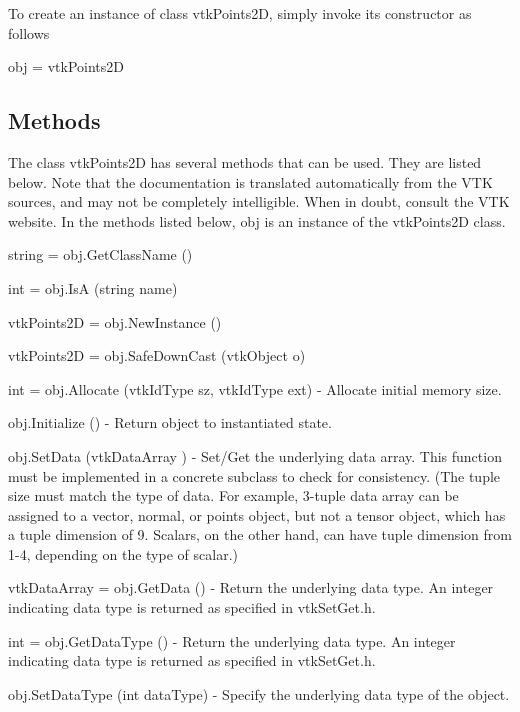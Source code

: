To create an instance of class vtk\-Points2\-D, simply invoke its constructor as follows \begin{DoxyVerb}  obj = vtkPoints2D
\end{DoxyVerb}
 \hypertarget{vtkwidgets_vtkxyplotwidget_Methods}{}\subsection{Methods}\label{vtkwidgets_vtkxyplotwidget_Methods}
The class vtk\-Points2\-D has several methods that can be used. They are listed below. Note that the documentation is translated automatically from the V\-T\-K sources, and may not be completely intelligible. When in doubt, consult the V\-T\-K website. In the methods listed below, {\ttfamily obj} is an instance of the vtk\-Points2\-D class. 
\begin{DoxyItemize}
\item {\ttfamily string = obj.\-Get\-Class\-Name ()}  
\item {\ttfamily int = obj.\-Is\-A (string name)}  
\item {\ttfamily vtk\-Points2\-D = obj.\-New\-Instance ()}  
\item {\ttfamily vtk\-Points2\-D = obj.\-Safe\-Down\-Cast (vtk\-Object o)}  
\item {\ttfamily int = obj.\-Allocate (vtk\-Id\-Type sz, vtk\-Id\-Type ext)} -\/ Allocate initial memory size.  
\item {\ttfamily obj.\-Initialize ()} -\/ Return object to instantiated state.  
\item {\ttfamily obj.\-Set\-Data (vtk\-Data\-Array )} -\/ Set/\-Get the underlying data array. This function must be implemented in a concrete subclass to check for consistency. (The tuple size must match the type of data. For example, 3-\/tuple data array can be assigned to a vector, normal, or points object, but not a tensor object, which has a tuple dimension of 9. Scalars, on the other hand, can have tuple dimension from 1-\/4, depending on the type of scalar.)  
\item {\ttfamily vtk\-Data\-Array = obj.\-Get\-Data ()} -\/ Return the underlying data type. An integer indicating data type is returned as specified in vtk\-Set\-Get.\-h.  
\item {\ttfamily int = obj.\-Get\-Data\-Type ()} -\/ Return the underlying data type. An integer indicating data type is returned as specified in vtk\-Set\-Get.\-h.  
\item {\ttfamily obj.\-Set\-Data\-Type (int data\-Type)} -\/ Specify the underlying data type of the object.  

\end{DoxyItemize}
